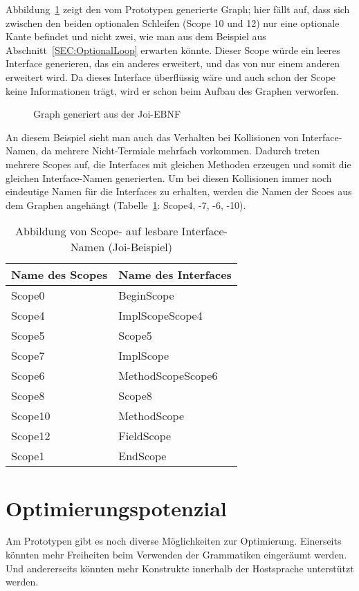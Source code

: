 \documentclass[../InterneDSLs.tex]{subfiles}
\begin{document}
Abbildung~\ref{FIG:JoiGraph} zeigt den vom Prototypen generierte Graph; hier fällt auf, dass sich zwischen den beiden optionalen Schleifen (Scope 10 und 12) nur eine optionale Kante befindet und nicht zwei, wie man aus dem Beispiel aus Abschnitt~\ref{SEC:OptionalLoop} erwarten könnte. Dieser Scope würde ein leeres Interface generieren, das ein anderes erweitert, und das von nur einem anderen erweitert wird. Da dieses Interface überflüssig wäre und auch schon der Scope keine Informationen trägt, wird er schon beim Aufbau des Graphen verworfen.
\begin{figure}[ht]
\centering
\resizebox{0.5\linewidth}{!}{}
\caption{Graph generiert aus der Joi-EBNF}
\label{FIG:JoiGraph}
\end{figure}

An diesem Beispiel sieht man auch das Verhalten bei Kollisionen von Interface-Namen, da mehrere Nicht-Termiale mehrfach vorkommen. Dadurch treten mehrere Scopes auf, die Interfaces mit gleichen Methoden erzeugen und somit die gleichen Interface-Namen generierten. Um bei diesen Kollisionen immer noch eindeutige Namen für die Interfaces zu erhalten, werden die Namen der Scoes aus dem Graphen angehängt (Tabelle~\ref{TAB:MappingJoiScopeToInterface}: Scope4, -7, -6, -10).
\begin{table}[ht]
\centering
\begin{tabular}{ll}
\textbf{Name des Scopes} & \textbf{Name des Interfaces}\\\hline
Scope0  & BeginScope\\
Scope4  & ImplScopeScope4\\
Scope5  & Scope5\\
Scope7  & ImplScope\\
Scope6  & MethodScopeScope6\\
Scope8  & Scope8\\
Scope10 & MethodScope\\
Scope12 & FieldScope\\
Scope1  & EndScope\\
\end{tabular}
\caption[Abbildung von Scope- auf Interfacenamen (Joi-Beispiel)]{Abbildung von Scope- auf lesbare Interface-Namen (Joi-Beispiel)}
\label{TAB:MappingJoiScopeToInterface}
\end{table}

\section{Optimierungspotenzial}
Am Prototypen gibt es noch diverse Möglichkeiten zur Optimierung. Einerseits könnten mehr Freiheiten beim Verwenden der Grammatiken eingeräumt werden. Und andererseits könnten mehr Konstrukte innerhalb der Hostsprache unterstützt werden.
\end{document}
